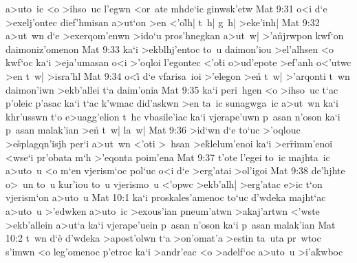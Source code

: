a>uto~ic
<o
>ihso~uc
l'egwn
<or~ate
mhde`ic
ginwsk'etw\bibvsend
\vs Mat 9:31
o<i
d`e
>exelj'ontec
dief'hmisan
a>ut`on
>en
<'o\r{l}h|
t~h|
g~h|
>eke'inh|\bibvsend
\vs Mat 9:32
a>ut~wn
d`e
>exerqom'enwn
>ido`u
pros'hnegkan
a>ut~w|
>'a\r{n}jrwpon
kwf`on
daimoniz'omenon\bibvsend
\vs Mat 9:33
ka`i
>ekblhj'entoc
to~u
daimon'iou
>el'alhsen
<o
kwf`oc
ka`i
>eja'umasan
o<i
>'oqloi
l'egontec
<'o\r{t}i
o>ud'epote
>ef'anh
o<'utwc
>en
t~w|
>isra'hl\bibvsend
\vs Mat 9:34
o<i\r{}
d`e
vfarisa~ioi
>'elegon
>e\r{n}
t~w|
>'arqonti
t~wn
daimon'iwn
>ekb'allei
t`a
daim'onia\bibvsend
\vs Mat 9:35
ka`i
peri~hgen
<o
>ihso~uc
t`ac
p'oleic
p'asac
ka`i
t`ac
k'wmac
did'askwn
>en
ta~ic
sunagwga~ic
a>ut~wn
ka`i
khr'usswn
t`o
e>uagg'elion
t~hc
vbasile'iac
ka`i
vjerape'uwn
p~asan
n'oson
ka`i
p~asan
malak'ian
>en\r{}
t~w|
la~w|\bibvsend
\vs Mat 9:36
>id`wn
d`e
to`uc
>'oqlouc
>e\r{s}plagqn'isjh
per`i
a>ut~wn
<'oti
>~hsan
>e\r{k}lelum'enoi
ka`i
>er\r{r}imm'enoi
<wse`i
pr'obata
m`h
>'eqonta
poim'ena\bibvsend
\vs Mat 9:37
t'ote
l'egei
to~ic
majhta~ic
a>uto~u
<o
m`en
vjerism`oc
pol`uc
o<i
d`e
>erg'atai
>ol'igoi\bibvsend
\vs Mat 9:38
de'hjhte
o>~un
to~u
kur'iou
to~u
vjerismo~u
<'opwc
>ekb'alh|
>erg'atac
e>ic
t`on
vjerism`on
a>uto~u\bibvsend
\vs Mat 10:1
ka`i
proskales'amenoc
to`uc
d'wdeka
majht`ac
a>uto~u
>'edwken
a>uto~ic
>exous'ian
pneum'atwn
>akaj'artwn
<'wste
>ekb'allein
a>ut`a
ka`i
vjerape'uein
p~asan
n'oson
ka`i
p~asan
malak'ian\bibvsend
\vs Mat 10:2
t~wn
d`e\r{}
d'wdeka
>apost'olwn
t`a
>on'omat'a
>estin
ta~uta
pr~wtoc
s'imwn
<o
leg'omenoc
p'etroc
ka`i
>andr'eac
<o
>adelf`oc
a>uto~u
>i'a\r{k}wboc
